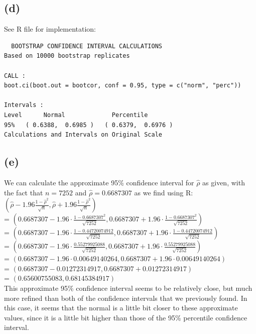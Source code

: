 \documentclass{article}
\begin{document}
{\subsection*{(d)}

See R file for implementation: \\ 
\begin{verbatim}
  BOOTSTRAP CONFIDENCE INTERVAL CALCULATIONS
Based on 10000 bootstrap replicates

CALL : 
boot.ci(boot.out = bootcor, conf = 0.95, type = c("norm", "perc"))

Intervals : 
Level      Normal             Percentile     
95%   ( 0.6388,  0.6985 )   ( 0.6379,  0.6976 )  
Calculations and Intervals on Original Scale
\end{verbatim}

\subsection*{(e)}

We can calculate the approximate 95\% confidence interval for $\hat{\rho}$ as given, with the fact that $n = 7252$ and $\hat{\rho} = 0.6687307$ as we find using R: \\
$(\hat{\rho} - 1.96 \frac{1 - \hat{\rho}^2}{\sqrt{n}}, \hat{\rho} + 1.96 \frac{1 - \hat{\rho}^2}{\sqrt{n}})$ \\
= $(0.6687307 - 1.96 \cdot \frac{1 - 0.6687307^2}{\sqrt{7252}}, 0.6687307 + 1.96 \cdot \frac{1 - 0.6687307^2}{\sqrt{7252}})$ \\
= $(0.6687307 - 1.96 \cdot \frac{1 - 0.44720074912}{\sqrt{7252}}, 0.6687307 + 1.96 \cdot \frac{1 - 0.44720074912}{\sqrt{7252}})$ \\
= $(0.6687307 - 1.96 \cdot \frac{0.55279925088}{\sqrt{7252}}, 0.6687307 + 1.96 \cdot \frac{0.55279925088}{\sqrt{7252}})$ \\
= $(0.6687307 - 1.96 \cdot 0.00649140264, 0.6687307 + 1.96 \cdot 0.00649140264)$ \\
= $(0.6687307 - 0.01272314917, 0.6687307 + 0.01272314917)$ \\
= $(0.65600755083, 0.68145384917)$ \\
This approximate 95\% confidence interval seems to be relatively close, but much more refined than both of the confidence intervals that we previously found. In this case, it seems that the normal is a little bit closer to these approximate values, since it is a little bit higher than those of the 95\% percentile confidence interval.
\newpage

}
\end{document}
